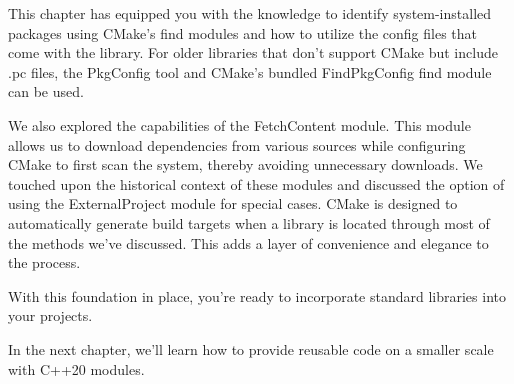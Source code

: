 This chapter has equipped you with the knowledge to identify system-installed packages using CMake’s find modules and how to utilize the config files that come with the library. For older libraries that don’t support CMake but include .pc files, the PkgConfig tool and CMake’s bundled FindPkgConfig find module can be used.

We also explored the capabilities of the FetchContent module. This module allows us to download dependencies from various sources while configuring CMake to first scan the system, thereby avoiding unnecessary downloads. We touched upon the historical context of these modules and discussed the option of using the ExternalProject module for special cases.
CMake is designed to automatically generate build targets when a library is located through most of the methods we’ve discussed. This adds a layer of convenience and elegance to the process.

With this foundation in place, you’re ready to incorporate standard libraries into your projects.

In the next chapter, we’ll learn how to provide reusable code on a smaller scale with C++20 modules.